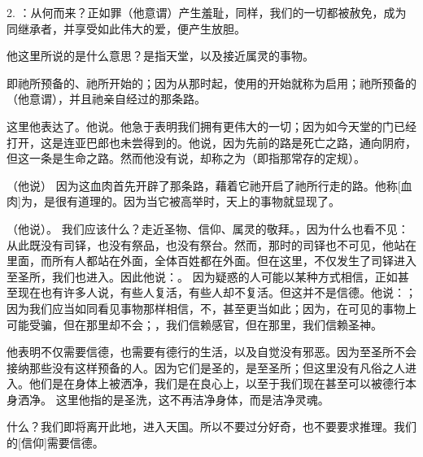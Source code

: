 2. ：从何而来？正如罪（他意谓）产生羞耻，同样，我们的一切都被赦免，成为同继承者，并享受如此伟大的爱，便产生放胆。\par

 他这里所说的是什么意思？是指天堂，以及接近属灵的事物。\par

 即祂所预备的、祂所开始的；因为从那时起，使用的开始就称为启用；祂所预备的（他意谓），并且祂亲自经过的那条路。\par

 这里他表达了。他说。他急于表明我们拥有更伟大的一切；因为如今天堂的门已经打开，这是连亚巴郎也未尝得到的。他说，因为先前的路是死亡之路，通向阴府，但这一条是生命之路。然而他没有说，却称之为（即指那常存的定规）。\par

（他说） 因为这血肉首先开辟了那条路，藉着它祂开启了祂所行走的路。他称[血肉]为，是很有道理的。因为当它被高举时，天上的事物就显现了。\par

（他说）。 我们应该什么？走近圣物、信仰、属灵的敬拜。，因为什么也看不见：从此既没有司铎，也没有祭品，也没有祭台。然而，那时的司铎也不可见，他站在里面，而所有人都站在外面，全体百姓都在外面。但在这里，不仅发生了司铎进入至圣所，我们也进入。因此他说：。 因为疑惑的人可能以某种方式相信，正如甚至现在也有许多人说，有些人复活，有些人却不复活。但这并不是信德。他说：；因为我们应当如同看见事物那样相信，不，甚至更当如此；因为，在可见的事物上可能受骗，但在那里却不会；，我们信赖感官，但在那里，我们信赖圣神。\par

 他表明不仅需要信德，也需要有德行的生活，以及自觉没有邪恶。因为至圣所不会接纳那些没有这样预备的人。因为它们是圣的，是至圣所；但这里没有凡俗之人进入。他们是在身体上被洒净，我们是在良心上，以至于我们现在甚至可以被德行本身洒净。 这里他指的是圣洗，这不再洁净身体，而是洁净灵魂。\par

 什么？我们即将离开此地，进入天国。所以不要过分好奇，也不要要求推理。我们的[信仰]需要信德。\par

